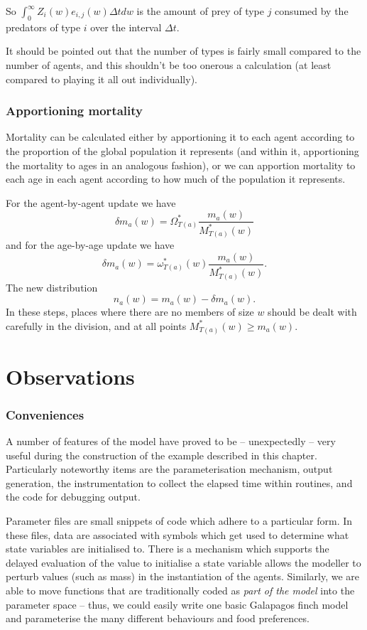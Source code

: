 So $\int_0^{\infty} Z_i (w) e_{i,j} (w) \Delta t d w$ is the amount of prey of
type $j$ consumed by the predators of type $i$ over the interval $\Delta t$.



It should be pointed out that the number of types is fairly small compared to
the number of agents, and this shouldn't be too onerous a calculation (at
least compared to playing it all out individually).

\subsubsection{Apportioning mortality}

Mortality can be calculated either by apportioning it to each agent according
to the proportion of the global population it represents (and within it,
apportioning the mortality to ages in an analogous fashion), or we can
apportion mortality to each age in each agent according to how much of the
population it represents.

For the agent-by-agent update we have
\[ \delta m_a (w) = \Omega^{\ast}_{T (a)}  \frac{m_a (w)}{M^{\ast}_{T (a)}
   (w)} \]
and for the age-by-age update we have
\[ \delta m_a (w) = \omega^{\ast}_{T (a)} (w)  \frac{m_a (w)}{M^{\ast}_{T (a)}
   (w)} . \]
The new distribution
\[ n_a (w) = m_a (w) - \delta m_a (w) . \]
In these steps, places where there are no members of size $w$ should be dealt
with carefully in the division, and at all points $M^{\ast}_{T (a)} (w)
\geqslant m_a (w)$.


\section{Observations}

\subsubsection{Conveniences}
A number of features of the model have proved to be -- unexpectedly --
very useful during the construction of the example described in this
chapter. Particularly noteworthy items are the parameterisation
mechanism, output generation, the instrumentation to collect the
elapsed time within routines, and the code for debugging output.

Parameter files are small snippets of \Scheme code which adhere to a
particular form. In these files, data are associated with symbols
which get used to determine what state variables are initialised to.
There is a mechanism which supports the delayed evaluation of the
value to initialise a state variable allows the modeller to perturb
values (such as mass) in the instantiation of the agents.  Similarly,
we are able to move functions that are traditionally coded
as \emph{part of the model} into the parameter space -- thus, we could
easily write one basic Galapagos finch model and parameterise the many
different behaviours and food preferences.

